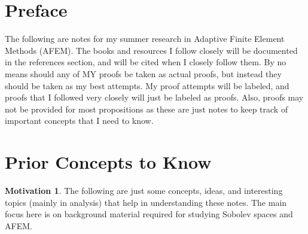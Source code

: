 \documentclass[11pt]{article}
\makeatletter
\theoremstyle{definition}
\newtheorem*{motivation}{Motivation}
\newcommand\frontmatter{%
    \cleardoublepage
  \pagenumbering{roman}}
\newcommand\mainmatter{%
    \cleardoublepage
  \pagenumbering{arabic}}
\makeatother
\begin{document}
\frontmatter
{}
\pagestyle{fancy}
\fancyhead[L]{}
\fancyhead[R]{}

\tableofcontents
\newpage

\section*{Preface}
%
The following are notes for my summer research in Adaptive Finite Element Methods (AFEM).
The books and resources I follow closely will be documented in the references section, and will be cited when I closely follow them.
By no means should any of MY proofs be taken as actual proofs, but instead they should be taken as my best attempts.
My proof attempts will be labeled, and proofs that I followed very closely will just be labeled as proofs.
Also, proofs may not be provided for most propositions as these are just notes to keep track of important concepts that I need to know.

\fancyhead[L]{\leftmark}
\fancyhead[R]{\rightmark}
\fancyhead[C]{}
\newpage
\mainmatter

\section{Prior Concepts to Know}
\begin{motivation}
The following are just some concepts, ideas, and interesting topics (mainly in analysis) that help in understanding these notes.
The main focus here is on background material required for studying Sobolev spaces and AFEM.
\end{motivation}
\end{document}
